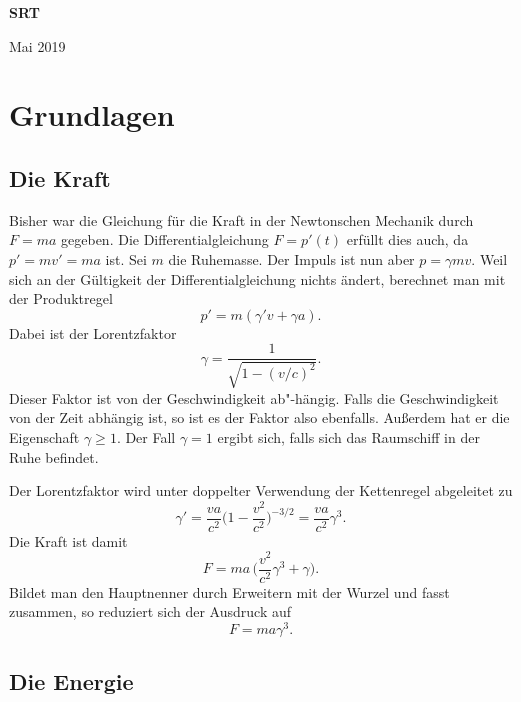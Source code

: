 \documentclass[a4paper,11pt,fleqn,twocolumn,twoside]{scrartcl}
\begin{document}
\begin{huge}
\noindent\normalfont\bfseries\sffamily
SRT
\par
\end{huge}

\vspace{1em}\noindent
Mai 2019

\tableofcontents

\section{Grundlagen}

\subsection{Die Kraft}

Bisher war die Gleichung für die Kraft in der Newtonschen Mechanik
durch $F=ma$ gegeben. Die Differentialgleichung $F=p'(t)$ erfüllt dies
auch, da $p'=mv'=ma$ ist. Sei $m$ die Ruhemasse.
Der Impuls ist nun aber $p=\gamma mv$. Weil sich an der Gültigkeit
der Differentialgleichung nichts ändert, berechnet man mit der
Produktregel%
\[p' = m(\gamma 'v + \gamma a).\]
Dabei ist der Lorentzfaktor
\[\gamma = \frac{1}{\sqrt{1-(v/c)^2}}.\]
Dieser Faktor ist von der Geschwindigkeit ab"-hängig.
Falls die Geschwindigkeit von der Zeit abhängig ist, so ist es der
Faktor also ebenfalls. Außerdem hat er die Eigenschaft $\gamma\ge 1$.
Der Fall $\gamma=1$ ergibt sich, falls sich das Raumschiff in der
Ruhe befindet.

Der Lorentzfaktor wird unter doppelter Verwendung der Kettenregel
abgeleitet zu%
\[\gamma' = \frac{va}{c^2}\Big(1-\frac{v^2}{c^2}\Big)^{-3/2}
= \frac{va}{c^2} \gamma^3.\]
Die Kraft ist damit
\[F = ma\,\Big(\frac{v^2}{c^2}\gamma^3 + \gamma\Big).\]
Bildet man den Hauptnenner durch Erweitern mit der Wurzel und fasst
zusammen, so reduziert sich der Ausdruck auf%
\[F = ma\gamma^3.\]

\subsection{Die Energie}
\end{document}
